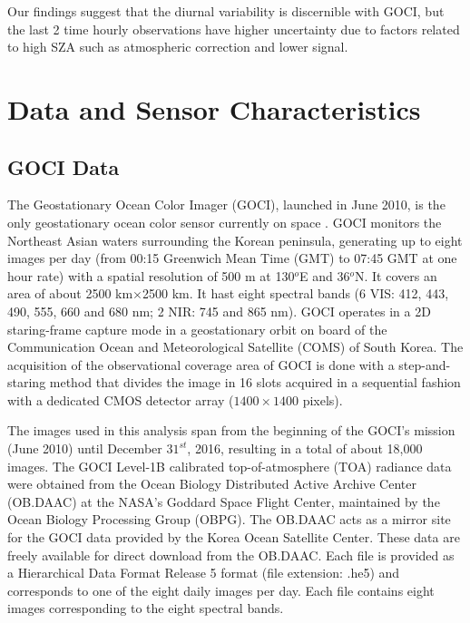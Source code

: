 \documentclass[onecolumn,3p,letterpaper,11pt]{elsarticle}
\begin{document}
Our findings suggest that the diurnal variability is discernible with GOCI, but the last 2 time hourly observations have higher uncertainty due to factors related to high SZA such as atmospheric correction and lower signal.




\section{Data and Sensor Characteristics}
\subsection{GOCI Data}
The Geostationary Ocean Color Imager (GOCI), launched in June 2010, is the only geostationary ocean color sensor currently on space \citep{Ryu2012}. GOCI monitors the Northeast Asian waters surrounding the Korean peninsula, generating up to eight images per day (from 00:15 Greenwich Mean Time (GMT) to 07:45 GMT at one hour rate) with a spatial resolution of 500 m at 130$^o$E and 36$^o$N. It covers an area of about 2500 km$\times$2500 km. It hast eight spectral bands (6 VIS: 412, 443, 490, 555, 660 and 680 nm; 2 NIR: 745 and 865 nm). GOCI operates in a 2D staring-frame capture mode in a geostationary orbit on board of the Communication Ocean and Meteorological Satellite (COMS) of South Korea. The acquisition of the observational coverage area of GOCI is done with a step-and-staring method that divides the image in 16 slots acquired in a sequential fashion with a dedicated CMOS detector array ($1400\times1400$ pixels).

The images used in this analysis span from the beginning of the GOCI's mission (June 2010) until December $31^{st}$, 2016, resulting in a total of about 18,000 images. The GOCI Level-1B calibrated top-of-atmosphere (TOA) radiance data were obtained from the Ocean Biology Distributed Active Archive Center (OB.DAAC) at the NASA's Goddard Space Flight Center, maintained by the Ocean Biology Processing Group (OBPG). The OB.DAAC acts as a mirror site for the GOCI data provided by the Korea Ocean Satellite Center. These data are freely available for direct download from the OB.DAAC. Each file is provided as a  Hierarchical Data Format Release 5 format (file extension: .he5) and corresponds to one of the eight daily images per day. Each file contains eight images corresponding to the eight spectral bands.
\end{document}
